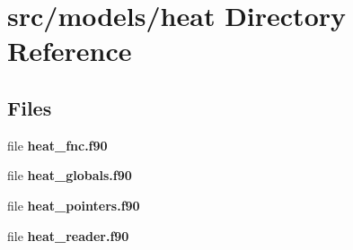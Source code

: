\section{src/models/heat Directory Reference}
\label{dir_2b9a3a78161b9e5fcc40f8138dcc39e6}
\subsection*{Files}
\begin{DoxyCompactItemize}
\item 
file {\bf heat\+\_\+fnc.\+f90}
\item 
file {\bf heat\+\_\+globals.\+f90}
\item 
file {\bf heat\+\_\+pointers.\+f90}
\item 
file {\bf heat\+\_\+reader.\+f90}
\end{DoxyCompactItemize}
